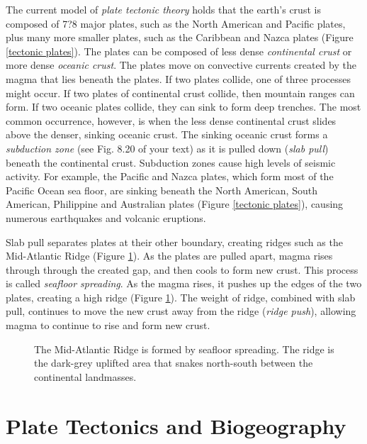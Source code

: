 \documentclass[11pt, oneside]{article}   	%
\begin{document}
The current model of \emph{plate tectonic theory} holds that the earth's crust is composed of 7?8  major plates, such as the North American and Pacific plates, plus many more smaller plates, such as the Caribbean and Nazca plates (Figure \ref{tectonic plates}). The plates can be composed of less dense \emph{continental crust} or more dense \emph{oceanic crust}.  The plates move on convective currents created by the magma that lies beneath the plates. If two plates collide, one of three processes might occur. If two plates of continental crust collide, then mountain ranges can form. If two oceanic plates collide, they can sink to form deep trenches. The most common occurrence, however, is when the less dense continental crust slides above the denser, sinking oceanic crust. The sinking oceanic crust forms a \emph{subduction zone} (see Fig. 8.20 of your text) as it is pulled down (\emph{slab pull}) beneath the continental crust. Subduction zones cause high levels of seismic activity. For example, the Pacific and Nazca plates, which form most of the Pacific Ocean sea floor, are sinking beneath the North American, South American, Philippine and Australian plates (Figure \ref{tectonic plates}), causing numerous earthquakes and volcanic eruptions. 

Slab pull separates plates at their other boundary, creating ridges such as the Mid-Atlantic Ridge (Figure \ref{mid atlantic ridge}). As the plates are pulled apart, magma rises through through the created gap, and then cools to form new crust. This process is called \emph{seafloor spreading}. As the magma rises, it pushes up the edges of the two plates, creating a high ridge (Figure \ref{mid atlantic ridge}). The weight of ridge, combined with slab pull, continues to move the new crust away from the ridge (\emph{ridge push}), allowing magma to continue to rise and form new crust.

\begin{figure}[tb]
	\centering
		\caption{The Mid-Atlantic Ridge is formed by seafloor spreading. The ridge is the dark-grey uplifted area that snakes north-south between the continental landmasses.\label{mid atlantic ridge}}
		
\end{figure}

\section{Plate Tectonics and Biogeography}
\end{document}
